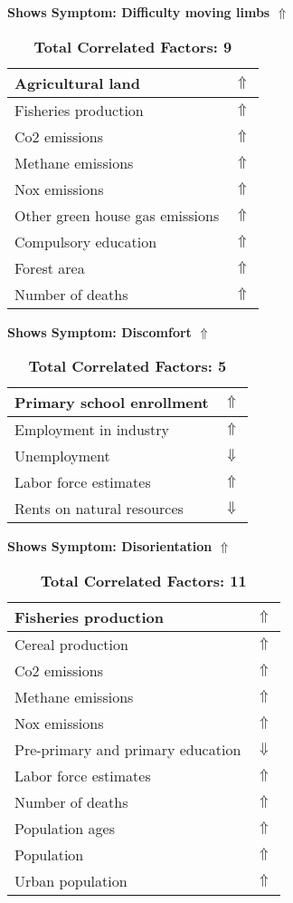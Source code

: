 \documentclass[12pt,notitlepage,oneside]{report}
\begin{document}
\clearpage
\begin{table}[!htb]
\caption{\textbf{Shows Symptom: Difficulty moving limbs $\Uparrow$}}
\centering
\label{Correlated Socio-economic Factors0}
\begin{tabular}{|l|l|}
\hline
Agricultural land & $\Uparrow$\\ \hline
Fisheries production & $\Uparrow$\\ \hline
Co2 emissions & $\Uparrow$\\ \hline
Methane emissions & $\Uparrow$\\ \hline
Nox emissions & $\Uparrow$\\ \hline
Other green house gas emissions & $\Uparrow$\\ \hline
Compulsory education & $\Uparrow$\\ \hline
Forest area & $\Uparrow$\\ \hline
Number of deaths & $\Uparrow$\\ \hline
\end{tabular}
\caption*{\textbf{Total Correlated Factors: 9}}
\end{table}
\begin{table}[!htb]
\caption{\textbf{Shows Symptom: Discomfort $\Uparrow$}}
\centering
\label{Correlated Socio-economic Factors0}
\begin{tabular}{|l|l|}
\hline
Primary school enrollment & $\Uparrow$\\ \hline
Employment in industry & $\Uparrow$\\ \hline
Unemployment & $\Downarrow$\\ \hline
Labor force estimates & $\Uparrow$\\ \hline
Rents on natural resources & $\Downarrow$\\ \hline
\end{tabular}
\caption*{\textbf{Total Correlated Factors: 5}}
\end{table}
\begin{table}[!htb]
\caption{\textbf{Shows Symptom: Disorientation $\Uparrow$}}
\centering
\label{Correlated Socio-economic Factors0}
\begin{tabular}{|l|l|}
\hline
Fisheries production & $\Uparrow$\\ \hline
Cereal production & $\Uparrow$\\ \hline
Co2 emissions & $\Uparrow$\\ \hline
Methane emissions & $\Uparrow$\\ \hline
Nox emissions & $\Uparrow$\\ \hline
Pre-primary and primary education & $\Downarrow$\\ \hline
Labor force estimates & $\Uparrow$\\ \hline
Number of deaths & $\Uparrow$\\ \hline
Population ages & $\Uparrow$\\ \hline
Population & $\Uparrow$\\ \hline
Urban population & $\Uparrow$\\ \hline
\end{tabular}
\caption*{\textbf{Total Correlated Factors: 11}}
\end{table}
\end{document}
